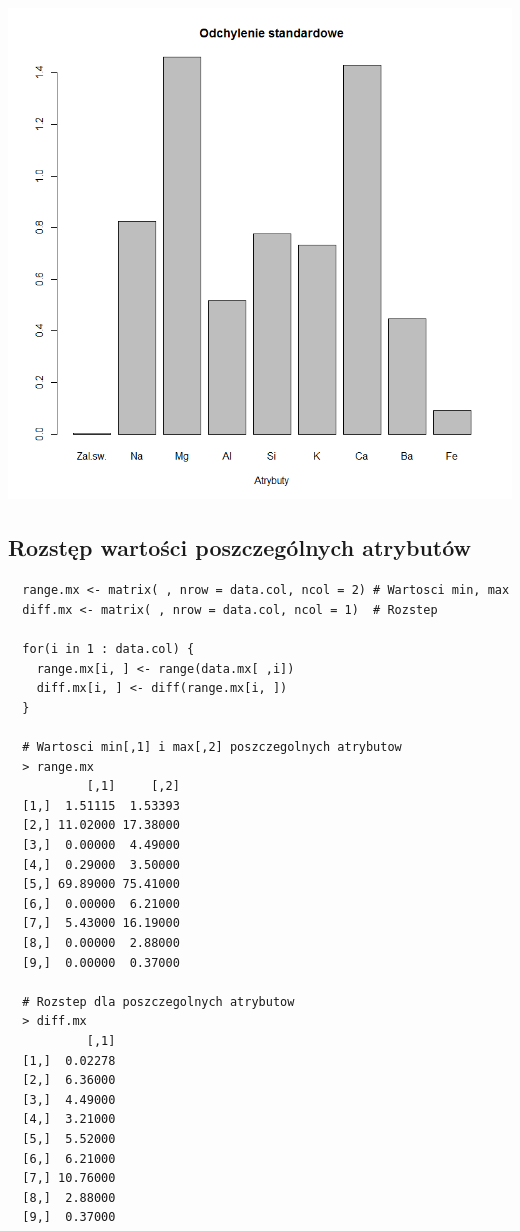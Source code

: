 \documentclass[a4paper,12pt,twoside]{article}
\begin{document}
\begin{center}
\includegraphics[width=.9\textwidth]{img/1_odchylenie_standardowe.png}
\end{center}

\subsection{Rozstęp wartości poszczególnych atrybutów}

\begin{lstlisting}
  range.mx <- matrix( , nrow = data.col, ncol = 2) # Wartosci min, max
  diff.mx <- matrix( , nrow = data.col, ncol = 1)  # Rozstep

  for(i in 1 : data.col) {
    range.mx[i, ] <- range(data.mx[ ,i])
    diff.mx[i, ] <- diff(range.mx[i, ])
  }

  # Wartosci min[,1] i max[,2] poszczegolnych atrybutow
  > range.mx
           [,1]     [,2]
  [1,]  1.51115  1.53393
  [2,] 11.02000 17.38000
  [3,]  0.00000  4.49000
  [4,]  0.29000  3.50000
  [5,] 69.89000 75.41000
  [6,]  0.00000  6.21000
  [7,]  5.43000 16.19000
  [8,]  0.00000  2.88000
  [9,]  0.00000  0.37000

  # Rozstep dla poszczegolnych atrybutow
  > diff.mx
           [,1]
  [1,]  0.02278
  [2,]  6.36000
  [3,]  4.49000
  [4,]  3.21000
  [5,]  5.52000
  [6,]  6.21000
  [7,] 10.76000
  [8,]  2.88000
  [9,]  0.37000
\end{lstlisting}
\end{document}
